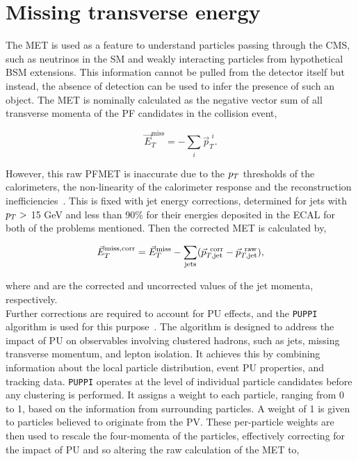 \section{Missing transverse energy}

The \ac{MET} is used as a feature to understand particles passing through the \ac{CMS}, such as neutrinos in the \ac{SM} and weakly interacting particles from hypothetical \ac{BSM} extensions.
This information cannot be pulled from the detector itself but instead, the absence of detection can be used to infer the presence of such an object.
The \ac{MET} is nominally calculated as the negative vector sum of all transverse momenta of the \ac{PF} candidates in the collision event,

\begin{equation}
\vec{E}_{T}^{\text{miss}} = - \sum_{i} \vec{p}_{T}^{\hspace{4pt}i}.
\end{equation}

However, this raw \ac{PF}\ac{MET} is inaccurate due to the $p_{T}$ thresholds of the calorimeters, the non-linearity of the calorimeter response and the reconstruction inefficiencies~\cite{CMS:2016ljj}.
This is fixed with jet energy corrections, determined for jets with $p_{T}>$ 15 GeV and less than 90\% for their energies deposited in the \ac{ECAL} for both of the problems mentioned. 
Then the corrected \ac{MET} is calculated by,

\begin{equation}
\vec{E}_{T}^{\text{miss,corr}} = \vec{E}_{T}^{\text{miss}} - \sum_{\text{jets}} (\vec{p}_{T,\text{jet}}^{\text{\hspace{4pt}corr}} - \vec{p}_{T,\text{jet}}^{\text{\hspace{4pt}raw}}),
\end{equation}

where  and  are the corrected and uncorrected values of the jet momenta, respectively. \\

Further corrections are required to account for \ac{PU} effects, and the \texttt{PUPPI} algorithm is used for this purpose~\cite{CMS:2020ebo}.
The algorithm is designed to address the impact of \ac{PU} on observables involving clustered hadrons, such as jets, missing transverse momentum, and lepton isolation. 
It achieves this by combining information about the local particle distribution, event \ac{PU} properties, and tracking data. 
\texttt{PUPPI} operates at the level of individual particle candidates before any clustering is performed. 
It assigns a weight to each particle, ranging from 0 to 1, based on the information from surrounding particles. 
A weight of 1 is given to particles believed to originate from the \ac{PV}. 
These per-particle weights are then used to rescale the four-momenta of the particles, effectively correcting for the impact of \ac{PU} and so altering the raw calculation of the \ac{MET} to,

